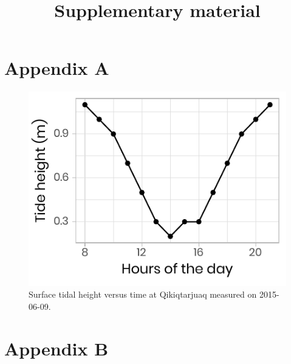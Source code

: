 \documentclass[12pt,a4paper]{scrartcl}
\title{Supplementary material}
\date{}
\begin{document}
\maketitle

\section*{Appendix A}

\renewcommand{\thefigure}{A\arabic{figure}}%
\renewcommand{\thetable}{A\arabic{table}}
\setcounter{figure}{0}
\setcounter{table}{0}

\begin{figure}[h]
	\centering
	\includegraphics[scale = 1]{../../../../graphs/supp_fig01.pdf}
	\caption{Surface tidal height versus time at Qikiqtarjuaq measured on 2015-06-09.}
\end{figure}

\clearpage
\newpage

\section*{Appendix B}

\renewcommand{\thefigure}{B\arabic{figure}}%
\renewcommand{\thetable}{B\arabic{table}}
\setcounter{figure}{0}
\setcounter{table}{0}
\end{document}
